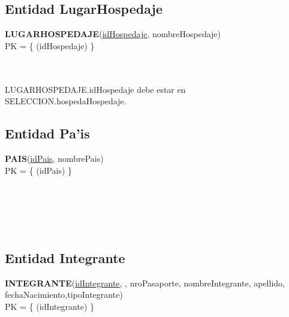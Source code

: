 \documentclass[11pt, a4paper, spanish]{article}
\begin{document}
\subsection{Entidad LugarHospedaje}
\textbf{LUGARHOSPEDAJE}(\underline{idHospedaje}, nombreHospedaje)\\

PK = \{ (idHospedaje) \}\\
\\
\\


LUGARHOSPEDAJE.idHospedaje debe estar en SELECCION.hospedaHospedaje. \\



\subsection{Entidad Pa'is}
\textbf{PAIS}(\underline{idPais}, nombrePais)\\

PK = \{ (idPais) \}\\
\\
\\


\\
\\



\subsection{Entidad Integrante}
\textbf{INTEGRANTE}(\underline{idIntegrante}, , nroPasaporte, nombreIntegrante, apellido, fechaNacimiento,tipoIntegrante)\\

PK = \{ (idIntegrante) \} \\
 \\
 \\
\end{document}
